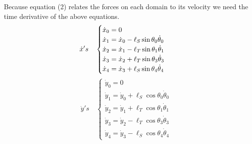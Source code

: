 \documentclass[a4paper, 11pt]{article}
\begin{document}
 \noindent Because equation (2) relates the forces on each domain to its velocity we need the time derivative of the above equations. 
 \begin{equation}
   \dot{x}'s \quad \begin{cases}
     \dot{x}_0 = 0 \\
     \dot{x}_1 = \dot{x}_0-\ell_S\sin\theta_0 \dot{\theta}_0 \\
     \dot{x}_2 = \dot{x}_1-\ell_T\sin\theta_1 \dot{\theta}_1 \\
     \dot{x}_3 = \dot{x}_2+\ell_T\sin\theta_3 \dot{\theta}_3 \\
     \dot{x}_4 = \dot{x}_3+\ell_S\sin\theta_4 \dot{\theta}_4
   \end{cases} \\
 \end{equation}
 \begin{equation}
   \dot{y}'s \quad \begin{cases}
     \dot{y}_0 = 0 \\
     \dot{y}_1 = \dot{y}_0 + \ell_S\cos\theta_0\dot{\theta}_0 \\
     \dot{y}_2 = \dot{y}_1 + \ell_T\cos\theta_1\dot{\theta}_1 \\
     \dot{y}_3 = \dot{y}_2 - \ell_T\cos\theta_3\dot{\theta}_3 \\
     \dot{y}_4 = \dot{y}_3 - \ell_S\cos\theta_4\dot{\theta}_4
   \end{cases} 
 \end{equation}
\end{document}
